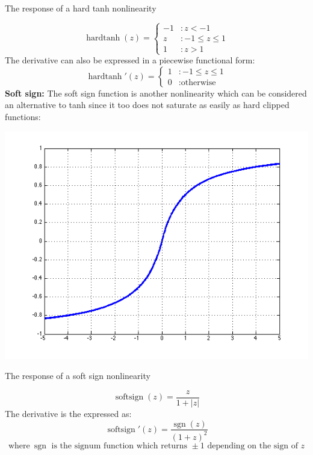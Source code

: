 \documentclass{tufte-handout}
\begin{document}
{\begin{marginfigure}
  \caption{The response of a hard tanh nonlinearity}
  \label{fig:graph_hardtanh}
\end{marginfigure}
\begin{displaymath}
    \operatorname{hardtanh}(z) = \left\{
     \begin{array}{cl}
       -1 & : z < -1\\
       z & : -1 \leq z \leq 1\\
       1 & : z > 1
     \end{array}
   \right.
\end{displaymath} 
The derivative can also be expressed in a piecewise functional form:
\begin{displaymath}
    \operatorname{hardtanh}'(z) = \left\{
     \begin{array}{cl}
       1 & : -1 \leq z \leq 1\\
       0 & : \text{otherwise}
     \end{array}
   \right.
\end{displaymath} 
\textbf{Soft sign:}
The soft sign function is another nonlinearity which can be considered an alternative to tanh since it too does not saturate as easily as hard clipped functions:
\begin{marginfigure}%
  \includegraphics[width=\linewidth]{graph_softsign}
  \caption{The response of a soft sign nonlinearity}
  \label{fig:graph_softsign}
\end{marginfigure}
$$\operatorname{softsign}(z) = \frac{z}{1 + |z|}$$
The derivative is the expressed as:
$$\operatorname{softsign}'(z) = \frac{\operatorname{sgn}(z)}{(1 + z)^2}$$
$$\text{where}~\operatorname{sgn} \text{ is the signum function which returns }\pm1\text{ depending on the sign of }z$$
}
\end{document}
